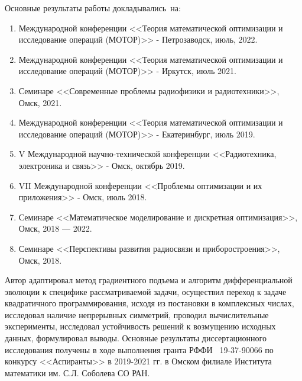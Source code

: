 {\probation}
Основные результаты работы докладывались~на:
\begin{enumerate}[beginpenalty=10000] %
  \item Международной конференции <<Теория математической оптимизации и исследование операций (МОТОР)>> - Петрозаводск, июль, 2022.
  \item Международной конференции <<Теория математической оптимизации и исследование операций (МОТОР)>> -  Иркутск, июль 2021.
  \item Семинаре <<Современные проблемы радиофизики и радиотехники>>, Омск, 2021.
  \item Международной конференции <<Теория математической оптимизации и исследование операций (МОТОР)>> - Екатеринбург, июль 2019.
  \item V Международной научно-технической конференции <<Радиотехника, электроника и связь>> - Омск, октябрь 2019.
  \item VII Международной конференции <<Проблемы оптимизации и их приложения>> - Омск, июль 2018.
  \item Семинаре <<Математическое моделирование и дискретная оптимизация>>, Омск, 2018 --- 2022.
  \item Семинаре <<Перспективы развития радиосвязи и приборостроения>>, Омск, 2018. 
\end{enumerate}

{\contribution} Автор адаптировал метод градиентного подъема и алгоритм дифференциальной эволюции к специфике рассматриваемой задачи, осуществил переход к задаче квадратичного программирования, исходя из постановки в комплексных числах, исследовал наличие непрерывных симметрий, проводил вычислительные эксперименты, исследовал устойчивость решений к возмущению исходных данных, формулировал выводы.
Основные результаты диссертационного исследования получены в ходе выполнения гранта РФФИ \No~19-37-90066 по конкурсу <<Аспиранты>> в 2019-2021 гг. в Омском филиале Института математики им. С.Л. Соболева СО РАН. 

